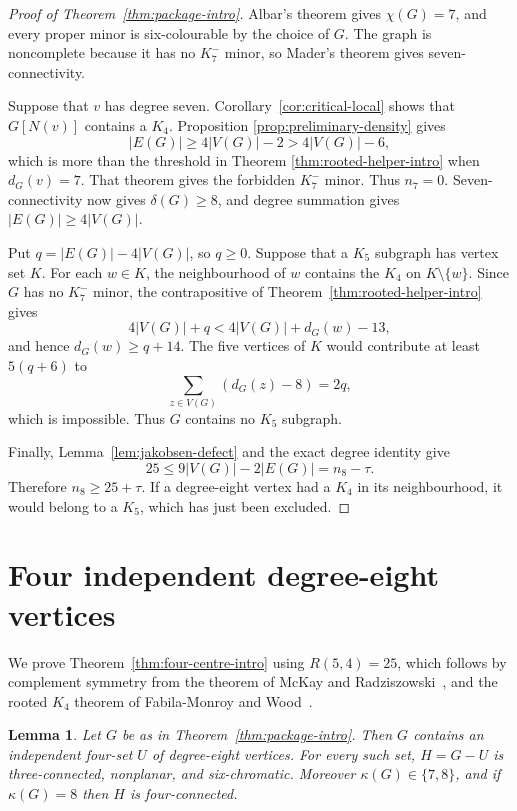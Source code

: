\documentclass[11pt]{amsart}
\newtheorem{lemma}[theorem]{Lemma}
\begin{document}
\begin{proof}[Proof of Theorem~\ref{thm:package-intro}]
Albar's theorem gives $\chi(G)=7$, and every proper minor is
six-colourable by the choice of $G$.  The graph is noncomplete because it
has no $K_7^{-}$ minor, so Mader's theorem gives seven-connectivity.

Suppose that $v$ has degree seven.  Corollary~\ref{cor:critical-local}
shows that $G[N(v)]$ contains a $K_4$.  Proposition
\ref{prop:preliminary-density} gives
\[
        |E(G)|\geq4|V(G)|-2>4|V(G)|-6,
\]
which is more than the threshold in Theorem
\ref{thm:rooted-helper-intro} when $d_G(v)=7$.  That theorem gives the
forbidden $K_7^{-}$ minor.  Thus $n_7=0$.  Seven-connectivity now gives
$\delta(G)\geq8$, and degree summation gives
$|E(G)|\geq4|V(G)|$.

Put $q=|E(G)|-4|V(G)|$, so $q\geq0$.  Suppose that a $K_5$ subgraph has
vertex set $K$.  For each $w\in K$, the neighbourhood of $w$ contains the
$K_4$ on $K\setminus\{w\}$.  Since $G$ has no $K_7^{-}$ minor, the
contrapositive of Theorem~\ref{thm:rooted-helper-intro} gives
\[
        4|V(G)|+q<4|V(G)|+d_G(w)-13,
\]
and hence $d_G(w)\geq q+14$.  The five vertices of $K$ would contribute at
least $5(q+6)$ to
\[
        \sum_{z\in V(G)}(d_G(z)-8)=2q,
\]
which is impossible.  Thus $G$ contains no $K_5$ subgraph.

Finally, Lemma~\ref{lem:jakobsen-defect} and the exact degree identity give
\[
        25\leq9|V(G)|-2|E(G)|=n_8-\tau.
\]
Therefore $n_8\geq25+\tau$.  If a degree-eight vertex had a $K_4$ in its
neighbourhood, it would belong to a $K_5$, which has just been excluded.
\end{proof}

\section{Four independent degree-eight vertices}

We prove Theorem~\ref{thm:four-centre-intro} using $R(5,4)=25$, which
follows by complement symmetry from the theorem of McKay and
Radziszowski~\cite{McKayRadziszowski1995}, and the rooted $K_4$ theorem of
Fabila-Monroy and Wood~\cite{FabilaMonroyWood2013}.

\begin{lemma}\label{lem:deleted-four-centres}
Let $G$ be as in Theorem~\ref{thm:package-intro}.  Then $G$ contains an
independent four-set $U$ of degree-eight
vertices.  For every such set, $H=G-U$ is three-connected, nonplanar, and
six-chromatic.  Moreover $\kappa(G)\in\{7,8\}$, and if $\kappa(G)=8$ then
$H$ is four-connected.
\end{lemma}
\end{document}
